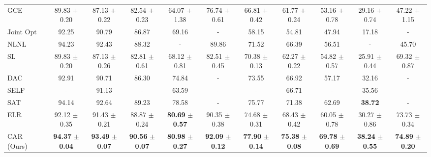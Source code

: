 \documentclass{article}
\begin{document}
\begin{table}
\begin{center}
{\begin{tabular}{ p{25mm} c c c  c c cc c c c c }
				\multirow{1}{*}{GCE \cite{zhang2018generalized}} & &89.83 $\pm$ 0.20 &87.13 $\pm$ 0.22&82.54 $\pm$ 0.23&64.07 $\pm$ 1.38&76.74 $\pm$ 0.61&66.81 $\pm$ 0.42&61.77 $\pm$ 0.24&53.16 $\pm$ 0.78&29.16 $\pm$ 0.74&47.22 $\pm$ 1.15\\ \multirow{1}{*}{Joint Opt \cite{tanaka2018joint}} & & 92.25 &90.79&86.87&69.16&-&58.15&54.81&47.94&17.18&-\\
\multirow{1}{*}{NLNL \cite{kim2019nlnl}} & & 94.23 &92.43&88.32&-&89.86&71.52&66.39&56.51&-&45.70\\
\multirow{1}{*}{SL \cite{wang2019symmetric}} & & 89.83 $\pm$ 0.20 &87.13 $\pm$ 0.26&82.81 $\pm$ 0.61&68.12 $\pm$ 0.81&82.51 $\pm$ 0.45&70.38 $\pm$ 0.13&62.27 $\pm$ 0.22&54.82 $\pm$ 0.57&25.91 $\pm$ 0.44&69.32 $\pm$ 0.87\\
\multirow{1}{*}{DAC \cite{thulasidasan2019combating}} & & 92.91 &90.71&86.30&74.84&-&73.55&66.92&57.17&32.16&-\\
\multirow{1}{*}{SELF \cite{nguyen2020self}} & & - &91.13&-&63.59&-&-&66.71&-&35.56&-\\
\multirow{1}{*}{SAT \cite{huang2020self}} & & 94.14&92.64&89.23&78.58&-&75.77&71.38&62.69&\textbf{38.72}&-\\
				
				\multirow{1}{*}{ELR \cite{liu2020early}} & & 92.12 $\pm$ 0.35&91.43 $\pm$ 0.21&88.87 $\pm$ 0.24&\textbf{80.69} $\pm$ \textbf{0.57}&90.35 $\pm$ 0.38&74.68 $\pm$ 0.31&68.43 $\pm$ 0.42&60.05 $\pm$ 0.78&30.27 $\pm$ 0.86&73.73 $\pm$ 0.34\\
\multirow{1}{*}{CAR (Ours)}& &\textbf{94.37} $\pm$ \textbf{0.04}&\textbf{93.49} $\pm$ \textbf{0.07}&\textbf{90.56} $\pm$ \textbf{0.07} &\textbf{80.98} $\pm$ \textbf{0.27}& \textbf{92.09} $\pm$ \textbf{0.12}& \textbf{77.90} $\pm$ \textbf{0.14}&\textbf{75.38} $\pm$ \textbf{0.08}&\textbf{69.78} $\pm$ \textbf{0.69}&\textbf{38.24} $\pm$ \textbf{0.55}&\textbf{74.89} $\pm$ \textbf{0.20} \\ \bottomrule
				
				
			\end{tabular}
}
	\end{center}
	\label{table:cifar10and100_resnet34}
\end{table}
\end{document}
